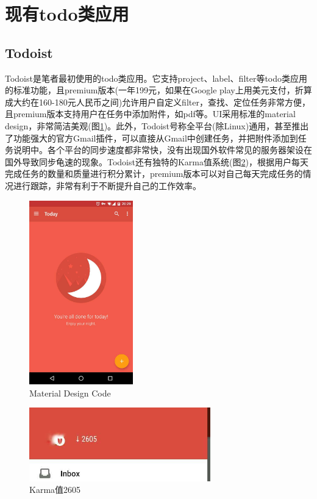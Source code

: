 \section{现有todo类应用}
    \subsection{Todoist}
    \label{sub:Todoist}

        Todoist是笔者最初使用的todo类应用。它支持project、label、filter等todo类应用的标准功能，且premium版本(一年199元，如果在Google play上用美元支付，折算成大约在160-180元人民币之间)允许用户自定义filter，查找、定位任务非常方便，且premium版本支持用户在任务中添加附件，如pdf等。UI采用标准的material design，非常简洁美观(图\ref{fig:design})。此外，Todoist号称全平台(除Linux)通用，甚至推出了功能强大的官方Gmail插件，可以直接从Gmail中创建任务，并把附件添加到任务说明中。各个平台的同步速度都非常快，没有出现国外软件常见的服务器架设在国外导致同步龟速的现象。Todoist还有独特的Karma值系统(图\ref{fig:karma})，根据用户每天完成任务的数量和质量进行积分累计，premium版本可以对自己每天完成任务的情况进行跟踪，非常有利于不断提升自己的工作效率。

        \begin{figure}[htbp]
            \centering
            \includegraphics[width=0.4\textwidth]{figure/design}
            \caption{Material Design Code}
            \label{fig:design}
        \end{figure}

        \begin{figure}[htbp]
            \centering
            \includegraphics[width=0.7\textwidth]{figure/karma}
            \caption{Karma值2605}
            \label{fig:karma}
        \end{figure}

